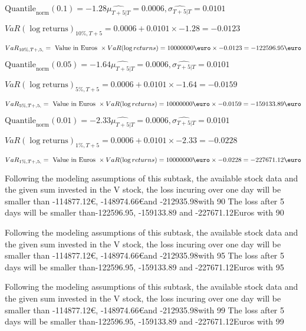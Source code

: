 $\text{Quantile}_\text{norm}(0.1) = -1.28$$\hat{\mu_{T+5|T}} = 0.0006, \hat{\sigma_{T+5|T}} = 0.0101$

$VaR(\log \text{returns})_{10\%, T + 5} = 0.0006 + 0.0101\times-1.28 = -0.0123$

$VaR_{10\%, T + ,5,} = \text{ Value in Euros } \times VaR(\log returns) = 10 000 000 \text{\euro} \times-0.0123 = -122596.95 \text{\euro}$


$\text{Quantile}_\text{norm}(0.05) = -1.64$$\hat{\mu_{T+5|T}} = 0.0006, \hat{\sigma_{T+5|T}} = 0.0101$

$VaR(\log \text{returns})_{5\%, T + 5} = 0.0006 + 0.0101\times-1.64 = -0.0159$

$VaR_{5\%, T + ,5,} = \text{ Value in Euros } \times VaR(\log returns) = 10 000 000 \text{\euro} \times-0.0159 = -159133.89 \text{\euro}$


$\text{Quantile}_\text{norm}(0.01) = -2.33$$\hat{\mu_{T+5|T}} = 0.0006, \hat{\sigma_{T+5|T}} = 0.0101$

$VaR(\log \text{returns})_{1\%, T + 5} = 0.0006 + 0.0101\times-2.33 = -0.0228$

$VaR_{1\%, T + ,5,} = \text{ Value in Euros } \times VaR(\log returns) = 10 000 000 \text{\euro} \times-0.0228 = -227671.12 \text{\euro}$


Following the modeling assumptions of this subtask, the available stock data and the given sum invested in the V stock, the loss incuring over one day will be smaller than -114877.12\euro, -148974.66\euro and -212935.98\euroEuros with 90%
The loss after 5 days will be smaller than-122596.95, -159133.89 and -227671.12Euros with 90%



Following the modeling assumptions of this subtask, the available stock data and the given sum invested in the V stock, the loss incuring over one day will be smaller than -114877.12\euro, -148974.66\euro and -212935.98\euroEuros with 95%
The loss after 5 days will be smaller than-122596.95, -159133.89 and -227671.12Euros with 95%



Following the modeling assumptions of this subtask, the available stock data and the given sum invested in the V stock, the loss incuring over one day will be smaller than -114877.12\euro, -148974.66\euro and -212935.98\euroEuros with 99%
The loss after 5 days will be smaller than-122596.95, -159133.89 and -227671.12Euros with 99%

